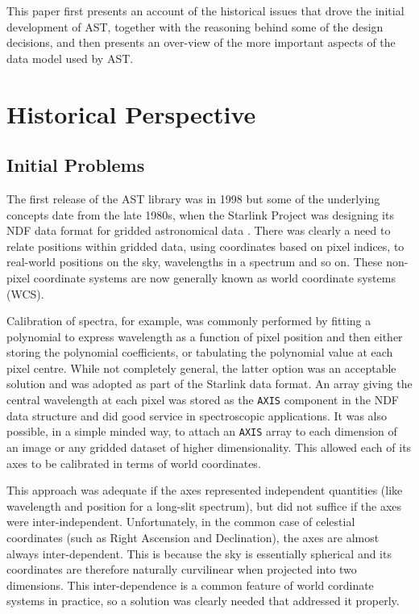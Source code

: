 \documentclass[final,authoryear,5p,times,twocolumn]{elsarticle}
\begin{document}
This paper first presents an account of the historical issues that drove
the initial development of AST, together with the reasoning behind some
of the design decisions, and then presents an over-view of the more
important aspects of the data model used by AST.

\section{Historical Perspective}

\subsection{Initial Problems}

The first release of the AST library was in 1998
\citep{1998StarB..20....7D,1998ASPC..145...41W} but some of the
underlying concepts date from the late 1980s, when the Starlink
Project was designing its NDF data format for gridded astronomical
data \citep{2015Jenness}. There was clearly a need to relate positions
within gridded data, using coordinates based on pixel indices, to
real-world positions on the sky, wavelengths in a spectrum and so
on. These non-pixel coordinate systems are now generally known as
world coordinate systems (WCS).

Calibration of spectra, for example, was commonly performed by fitting
a polynomial to express wavelength as a function of pixel position and
then either storing the polynomial coefficients, or tabulating the
polynomial value at each pixel centre. While not completely general,
the latter option was an acceptable solution and was adopted as part
of the Starlink data format. An array giving the central wavelength at
each pixel was stored as the \texttt{AXIS} component in the NDF data
structure and did good service in spectroscopic applications. It was
also possible, in a simple minded way, to attach an \texttt{AXIS}
array to each dimension of an image or any gridded dataset of higher
dimensionality. This allowed each of its axes to be calibrated in
terms of world coordinates.

This approach was adequate if the axes represented independent
quantities (like wavelength and position for a long-slit spectrum),
but did not suffice if the axes were inter-independent. Unfortunately,
in the common case of celestial coordinates (such as Right Ascension
and Declination), the axes are almost always inter-dependent. This is
because the sky is essentially spherical and its coordinates are
therefore naturally curvilinear when projected into two
dimensions. This inter-dependence is a common feature of world
cordinate systems in practice, so a solution was clearly needed that
addressed it properly.
\end{document}
